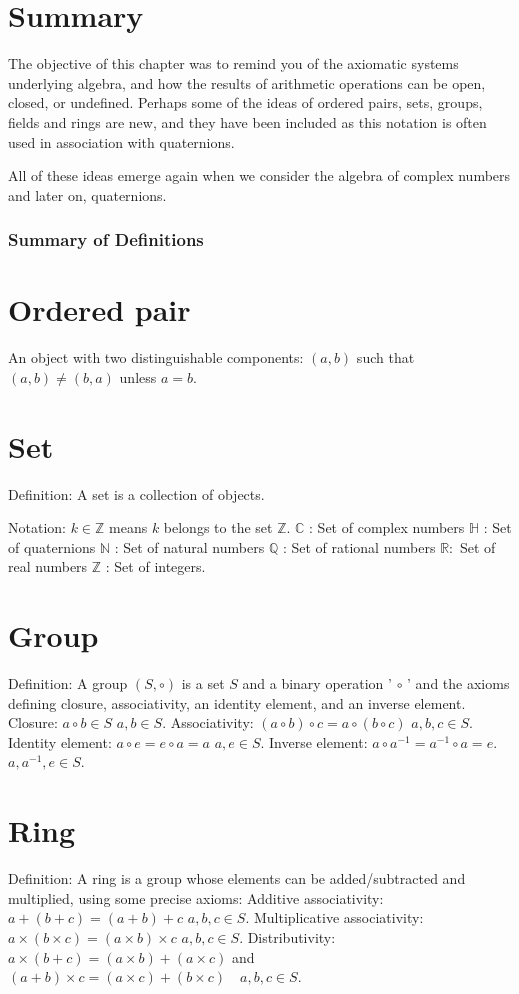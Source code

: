 \section{Summary}
The objective of this chapter was to remind you of the axiomatic systems underlying algebra, and how the results of arithmetic operations can be open, closed, or undefined. Perhaps some of the ideas of ordered pairs, sets, groups, fields and rings are new, and they have been included as this notation is often used in association with quaternions.

All of these ideas emerge again when we consider the algebra of complex numbers and later on, quaternions.

\subsubsection{Summary of Definitions}
\section{Ordered pair}
An object with two distinguishable components: $(a, b)$ such that $(a, b) \neq(b, a)$ unless $a=b$.

\section{Set}
Definition: A set is a collection of objects.

Notation: $k \in \mathbb{Z}$ means $k$ belongs to the set $\mathbb{Z}$.
$\mathbb{C}$ : Set of complex numbers
$\mathbb{H}$ : Set of quaternions
$\mathbb{N}$ : Set of natural numbers
$\mathbb{Q}$ : Set of rational numbers
$\mathbb{R}:$ Set of real numbers
$\mathbb{Z}$ : Set of integers.

\section{Group}
Definition: A group $(S, \circ)$ is a set $S$ and a binary operation ' $\circ$ ' and the axioms defining closure, associativity, an identity element, and an inverse element.
Closure:
$a \circ b \in S$
$a, b \in S$.
Associativity:
$(a \circ b) \circ c=a \circ(b \circ c)$
$a, b, c \in S$.
Identity element:
$a \circ e=e \circ a=a$
$a, e \in S$.
Inverse element:
$a \circ a^{-1}=a^{-1} \circ a=e$.
$a, a^{-1}, e \in S$.

\section{Ring}
Definition: A ring is a group whose elements can be added/subtracted and multiplied, using some precise axioms:
Additive associativity:
$a+(b+c)=(a+b)+c$
$a, b, c \in S$.
Multiplicative associativity: $a \times(b \times c)=(a \times b) \times c$
$a, b, c \in S$.
Distributivity:
$a \times(b+c)=(a \times b)+(a \times c)$ and
$(a+b) \times c=(a \times c)+(b \times c) \quad a, b, c \in S$.

